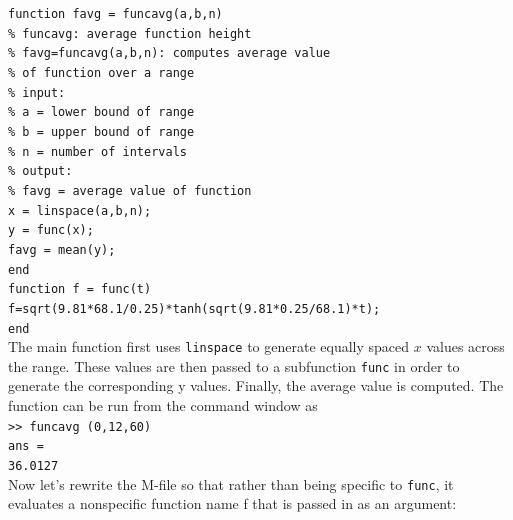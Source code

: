 \documentclass[../main.tex]{subfiles}
\begin{document}
\begin{example}
    \texttt{function favg = funcavg(a,b,n)\\
    \indent \% funcavg: average function height\\
    \indent \% \hspace{2mm}favg=funcavg(a,b,n): computes average value\\
    \indent \% \indent\indent of function over a range\\
    \indent \% input:\\
    \indent \% \hspace{2mm}a = lower bound of range\\
    \indent \% \hspace{2mm}b = upper bound of range\\
    \indent \% \hspace{2mm}n = number of intervals\\
    \indent \% output:\\
    \indent \% \hspace{2mm}favg = average value of function\\
    \indent x = linspace(a,b,n);\\
    \indent y = func(x);\\
    \indent favg = mean(y);\\
    \indent end\\
    \indent function f = func(t)\\
    \indent f=sqrt(9.81*68.1/0.25)*tanh(sqrt(9.81*0.25/68.1)*t);\\
    \indent end}\\

    The main function first uses \texttt{linspace} to generate equally spaced $x$ values across
    the range. These values are then passed to a subfunction \texttt{func} in order to generate the corresponding
    y values. Finally, the average value is computed. The function can be run from
    the command window as\\

    \texttt{>> funcavg (0,12,60)\\
    \indent ans =\\
    \indent\hspace{2mm} 36.0127}\\

    Now let's rewrite the M-file so that rather than being specific to \texttt{func}, it evaluates a
    nonspecific function name f that is passed in as an argument:\\


\end{example}
\end{document}
